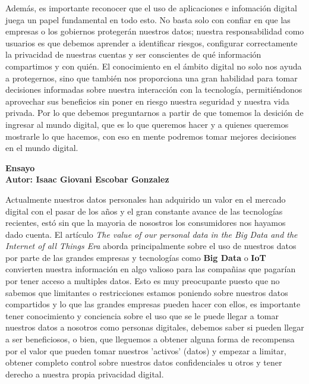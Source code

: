 \documentclass[12pt]{report}
\begin{document}
\begin{enumerate}[label=\textbf{\arabic*.}, leftmargin=*]
\begin{enumerate}[label=\textbf{\alph*.}, leftmargin=*, itemsep=1.0em]
Además, es importante reconocer que el uso de aplicaciones e infomaci\'on digital juega un papel fundamental en todo esto. No basta solo con confiar en que las empresas o los gobiernos protegerán nuestros datos; nuestra responsabilidad como usuarios es que debemos aprender a identificar riesgos, configurar correctamente la privacidad de nuestras cuentas y ser conscientes de qué información compartimos y con quién. El conocimiento en el ámbito digital no solo nos ayuda a protegernos, sino que también nos proporciona una gran habilidad para tomar decisiones informadas sobre nuestra interacción con la tecnología, permitiéndonos aprovechar sus beneficios sin poner en riesgo nuestra seguridad y nuestra vida privada. Por lo que debemos preguntarnos a partir de que tomemos la desici\'on de ingresar al mundo digital, que es lo que queremos hacer y a quienes queremos mostrarle lo que hacemos, con eso en mente podremos tomar mejores decisiones en el mundo digital.


\newpage
\textbf{Ensayo\\
        Autor: Isaac Giovani Escobar Gonzalez}

Actualmente nuestros datos personales han adquirido un valor en el mercado digital con el pasar de los años y el gran constante avance de las tecnologías recientes, estó sin que la mayoria de nosostros los consumidores nos hayamos dado cuenta. El artículo \textit{The value of our personal data in the Big Data and the Internet of all Things Era} aborda principalmente sobre el uso de nuestros datos por parte de las grandes empresas y tecnologías como \textbf{Big Data} o \textbf{IoT} convierten nuestra información en algo valioso para las compañias que pagarían por tener acceso a multiples datos. Esto es muy preocupante puesto que no sabemos que limitantes o restricciones estamos poniendo sobre nuestros datos compartidos y lo que las grandes empresas pueden hacer con ellos, es importante tener conocimiento y conciencia sobre el uso que se le puede llegar a tomar nuestros datos a nosotros como personas digitales, debemos saber si pueden llegar a ser beneficiosos, o bien, que lleguemos a obtener alguna forma de recompensa por el valor que pueden tomar nuestros 'activos' (datos) y empezar a limitar, obtener completo control sobre nuestros datos confidenciales u otros y tener derecho a nuestra propia privacidad digital.\\


\end{enumerate}
\end{enumerate}
\end{document}
